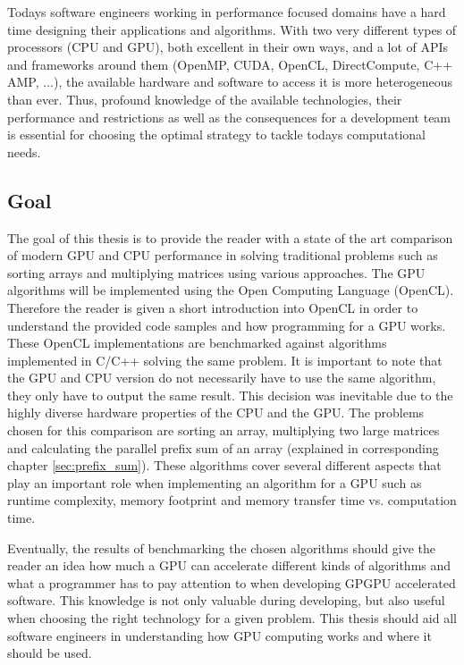 Todays software engineers working in performance focused domains have a hard time designing their applications and algorithms. With two very different types of processors (CPU and GPU), both excellent in their own ways, and a lot of APIs and frameworks around them (OpenMP, CUDA, OpenCL, DirectCompute, C++ AMP, ...), the available hardware and software to access it is more heterogeneous than ever. Thus, profound knowledge of the available technologies, their performance and restrictions as well as the consequences for a development team is essential for choosing the optimal strategy to tackle todays computational needs.

\subsection{Goal}
The goal of this thesis is to provide the reader with a state of the art comparison of modern GPU and CPU performance in solving traditional problems such as sorting arrays and multiplying matrices using various approaches.
The GPU algorithms will be implemented using the Open Computing Language (OpenCL). Therefore the reader is given a short introduction into OpenCL in order to understand the provided code samples and how programming for a GPU works. These OpenCL implementations are benchmarked against algorithms implemented in C/C++ solving the same problem. It is important to note that the GPU and CPU version do not necessarily have to use the same algorithm, they only have to output the same result. This decision was inevitable due to the highly diverse hardware properties of the CPU and the GPU.
The problems chosen for this comparison are sorting an array, multiplying two large matrices and calculating the parallel prefix sum of an array (explained in corresponding chapter \ref{sec:prefix_sum}). These algorithms cover several different aspects that play an important role when implementing an algorithm for a GPU such as runtime complexity, memory footprint and memory transfer time vs. computation time. 

Eventually, the results of benchmarking the chosen algorithms should give the reader an idea how much a GPU can accelerate different kinds of algorithms and what a programmer has to pay attention to when developing GPGPU accelerated software. This knowledge is not only valuable during developing, but also useful when choosing the right technology for a given problem. This thesis should aid all software engineers in understanding how GPU computing works and where it should be used.

